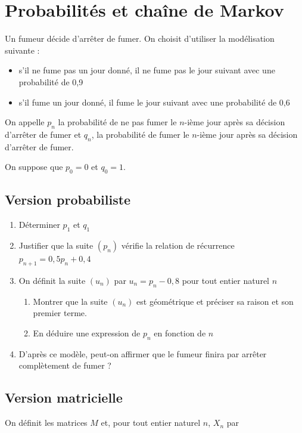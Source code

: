 \documentclass[oneside,12pt]{article}
\begin{document}
\section{Probabilités et chaîne de Markov}
Un fumeur décide d'arrêter de fumer. On choisit d'utiliser la modélisation suivante :

\setlength\parindent{6mm}
\begin{itemize}
\item[$\bullet~~$] s'il ne fume pas un jour donné, il ne fume pas le jour suivant avec une probabilité de 0,9
\item[$\bullet~~$] s'il fume un jour donné, il fume le jour suivant avec une probabilité de 0,6
\end{itemize}
\setlength\parindent{0mm}

On appelle $p_n$ la probabilité de ne pas fumer le $n$-ième jour après sa décision d'arrêter de fumer et $q_n$, la probabilité de fumer le $n$-ième jour après sa décision d'arrêter de fumer.

On suppose que $p_0 = 0$ et $q_0 = 1$.

\subsection{Version probabiliste}
\begin{enumerate}
    \item Déterminer $p_1$ et $q_1$
    \item Justifier que la suite $(p_n)$ vérifie la relation de récurrence $p_{n+1}=0,5p_n+0,4$
    \item On définit la suite $(u_n)$ par $u_n=p_n-0,8$ pour tout entier naturel $n$
    \begin{enumerate}
        \item Montrer que la suite $(u_n)$ est géométrique et préciser sa raison et son premier terme.
        \item En déduire une expression de $p_n$ en fonction de $n$
    \end{enumerate}        
    \item D'après ce modèle, peut-on affirmer que le fumeur finira par arrêter complètement de fumer ?
\end{enumerate}


\subsection{Version matricielle}
On définit les matrices $M$ et, pour tout entier naturel $n$,\: $X_n$ par
\end{document}
